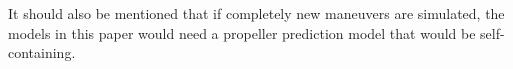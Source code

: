 It should also be mentioned that if completely new maneuvers are simulated, the models in this paper would need a propeller prediction model that would be self-containing.
